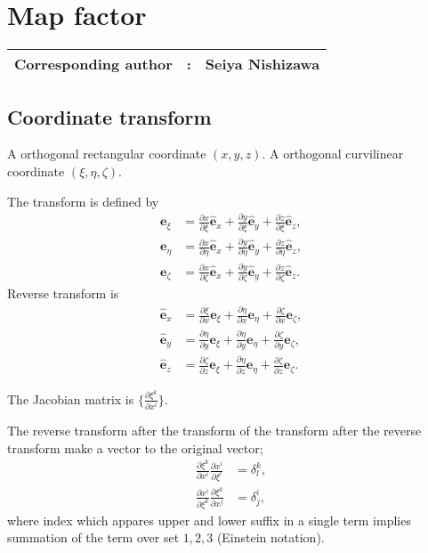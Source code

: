 %

\chapter{Map factor}
\label{chap: map factor}
{\bf \Large 
\begin{tabular}{ccc}
\hline
  Corresponding author & : & Seiya Nishizawa\\
\hline
\end{tabular}
}

\newcommand{\pd}[2]{\frac{\partial #1}{\partial #2}}


\section{Coordinate transform}
A orthogonal rectangular coordinate $(x, y, z)$.
A orthogonal curvilinear coordinate $(\xi, \eta, \zeta)$.


The transform is defined by
\begin{align}
  \bm{e}_\xi &= \pd{x}{\xi}\bm{\hat{e}}_x + \pd{y}{\xi}\bm{\hat{e}}_y + \pd{z}{\xi}\bm{\hat{e}}_z, \\
  \bm{e}_\eta &= \pd{x}{\eta}\bm{\hat{e}}_x + \pd{y}{\eta}\bm{\hat{e}}_y + \pd{z}{\eta}\bm{\hat{e}}_z, \\
  \bm{e}_\zeta &= \pd{x}{\zeta}\bm{\hat{e}}_x + \pd{y}{\zeta}\bm{\hat{e}}_y + \pd{z}{\zeta}\bm{\hat{e}}_z.
\end{align}
Reverse transform is
\begin{align}
  \bm{\hat{e}}_x &= \pd{\xi}{x}\bm{e}_\xi + \pd{\eta}{x}\bm{e}_\eta + \pd{\zeta}{x}\bm{e}_\zeta, \\
  \bm{\hat{e}}_y &= \pd{\eta}{y}\bm{e}_\xi + \pd{\eta}{y}\bm{e}_\eta + \pd{\zeta}{y}\bm{e}_\zeta, \\
  \bm{\hat{e}}_z &= \pd{\zeta}{z}\bm{e}_\xi + \pd{\eta}{z}\bm{e}_\eta + \pd{\zeta}{z}\bm{e}_\zeta.
\end{align}

The Jacobian matrix is $\{\pd{\xi^k}{x^i}\}$.


The reverse transform after the transform of the transform after the reverse transform make a vector to the original vector;
\begin{align}
  \pd{\xi^k}{x^i}\pd{x^i}{\xi^l} &= \delta_l^k, \\
  \pd{x^i}{\xi^k}\pd{\xi^k}{x^j} &= \delta_j^i,
\end{align}
where index which appares upper and lower suffix in a single term implies summation of the term over set ${1,2,3}$ (Einstein notation).


